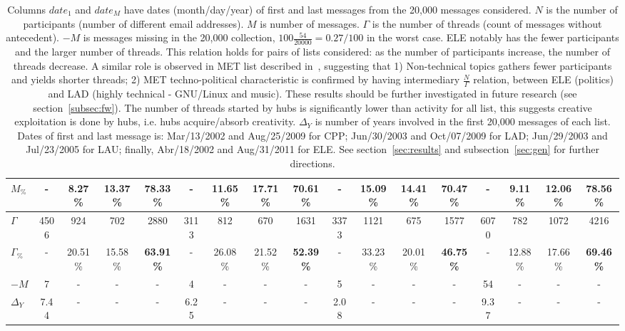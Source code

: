 \documentclass[%
 aip,
 jmp,%
 amsmath,amssymb,
 reprint,%
 floatfix,
]{revtex4-1}
\begin{document}
\begin{table}
\begin{tabular}{|l|| c|c|c|c||  c|c|c|c||   c|c|c|c||   c|c|c|c|}
$M_{\%}$  & - & 8.27\% & 13.37\% & {\bf 78.33\%} & - & 11.65\% & 17.71\% & {\bf 70.61\%} & - & 15.09\% & 14.41\% & {\bf 70.47\%} & - & 9.11\% & 12.06\% & {\bf 78.56\%} \\\hline
$\Gamma$  & 4506 & 924 & 702 & 2880 & 3113 & 812 & 670 & 1631 & 3373 & 1121 & 675 & 1577 & 6070 & 782 & 1072 & 4216 \\
$\Gamma_{\%}$  & - & 20.51\% & 15.58\% & {\bf 63.91\%} & - & 26.08\% & 21.52\% & {\bf 52.39\%} & - & 33.23\% & 20.01\% & {\bf 46.75\%} & - & 12.88\% & 17.66\% & {\bf 69.46\%} \\\hline\hline
$-M$               & 7     &-&-&-      & 4 &-&-&-          & 5 &-&-&-           & 54 &-&-&-   \\ \hline
$\Delta_Y$ & 7.44 & - & - & - &                                  6.25  & - & - & - & 2.08  & - & - & - &     9.37 & - & - & - \\ \hline 
  \end{tabular}
  \caption{Columns $date_1$ and $date_M$ have dates (month/day/year) of first and last messages from the 20,000 messages considered. $N$ is the number of participants (number of different email addresses). $M$ is number of messages. $\Gamma$ is the number of threads (count of messages without antecedent). $-M$ is messages missing in the 20,000 collection, $100\frac{54}{20000}=0.27/100$ in the worst case. ELE notably has the fewer participants and the larger number of threads. This relation holds for pairs of lists considered: as the number of participants increase, the number of threads decrease. A similar role is observed in MET list described in~\cite{evoSN}, suggesting that 1) Non-technical topics gathers fewer participants and yields shorter threads; 2) MET techno-political characteristic is confirmed by having intermediary $\frac{N}{\Gamma}$ relation, between ELE (politics) and LAD (highly technical - GNU/Linux and music). These results should be further investigated in future research (see section~\ref{subsec:fw}). The number of threads started by hubs is significantly lower than activity for all list, this suggests creative exploitation is done by hubs, i.e. hubs acquire/absorb creativity. $\Delta_Y$ is number of years involved in the first 20,000 messages of each list. Dates of first and last message is: Mar/13/2002 and Aug/25/2009 for CPP; Jun/30/2003 and Oct/07/2009 for LAD; Jun/29/2003 and Jul/23/2005 for LAU; finally, Abr/18/2002 and Aug/31/2011 for ELE. See section~\ref{sec:results} and subsection~\ref{sec:gen} for further directions.}
  \label{geralListas}\label{tab:bas}
\end{table}
\end{document}
